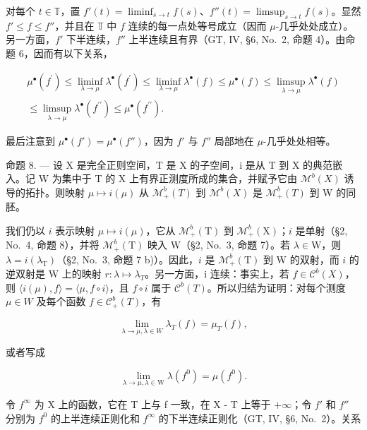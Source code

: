 对每个 \(t \in \mathbb{T}\)，置 \(f'(t) = \liminf_{s \to t} f(s)\)、\(f''(t) = \limsup_{s \to t} f(s)\)。显然 \(f' \leqslant f \leqslant f''\)，并且在 \(\mathbb{T}\) 中 \(f\) 连续的每一点处等号成立（因而 \(\mu\)-几乎处处成立）。另一方面，\(f'\) 下半连续，\(f''\) 上半连续且有界（GT, IV, §6, No.~2, 命题 4）。由命题 6，因而有以下关系，

\[
\begin{array}{c} \mu^ {\bullet} (f ^ {\prime}) \leqslant \liminf _ {\lambda \to \mu} \lambda^ {\bullet} (f ^ {\prime}) \leqslant \liminf _ {\lambda \to \mu} \lambda^ {\bullet} (f) \leqslant \mu^ {\bullet} (f) \leqslant \limsup _ {\lambda \to \mu} \lambda^ {\bullet} (f) \\ \leqslant \limsup _ {\lambda \to \mu} \lambda^ {\bullet} (f ^ {\prime \prime}) \leqslant \mu^ {\bullet} (f ^ {\prime \prime}). \end{array}
\]

最后注意到 \(\mu^{\bullet}(f') = \mu^{\bullet}(f'')\)，因为 \(f'\) 与 \(f''\) 局部地在 \(\mu\)-几乎处处相等。

命题 8. --- 设 X 是完全正则空间，T 是 X 的子空间，i 是从 T 到 X 的典范嵌入。记 W 为集中于 T 的 X 上有界正测度所成的集合，并赋予它由 \(\mathcal{M}^{b}(X)\) 诱导的拓扑。则映射 \(\mu \mapsto i(\mu)\) 从 \(\mathcal{M}_{+}^{b}(T)\) 到 \(\mathcal{M}^{b}(X)\) 是 \(\mathcal{M}_{+}^{b}(T)\) 到 W 的同胚。

我们仍以 \(i\) 表示映射 \(\mu \mapsto i(\mu)\)，它从 \(\mathcal{M}_{+}^{b}(\mathrm{T})\) 到 \(\mathcal{M}_{+}^{b}(\mathrm{X})\)；\(i\) 是单射（§2, No.~4, 命题 8），并将 \(\mathcal{M}_{+}^{b}(\mathrm{T})\) 映入 W（§2, No.~3, 命题 7）。若 \(\lambda \in \mathrm{W}\)，则 \(\lambda = i(\lambda_{\mathrm{T}})\)（§2, No.~3, 命题 7 b)）。因此，\(i\) 是 \(\mathcal{M}_{+}^{b}(\mathrm{T})\) 到 W 的双射，而 \(i\) 的逆双射是 W 上的映射 \(r : \lambda \mapsto \lambda_{T}\)。另一方面，i 连续：事实上，若 \(f \in \mathcal{C}^{b}(X)\)，则 \(\langle i(\mu), f \rangle = \langle \mu, f \circ i \rangle\)，且 \(f \circ i\) 属于 \(\mathcal{C}^{b}(T)\)。所以归结为证明：对每个测度 \(\mu \in W\) 及每个函数 \(f \in \mathcal{C}_{+}^{b}(T)\)，有

\[
\lim _ {\lambda \to \mu , \lambda \in W} \lambda_ {T} (f) = \mu_ {T} (f),
\]

或者写成

\[
\lim _ {\lambda \to \mu ,   \lambda \in \mathrm{W}} \lambda (f ^ {0}) = \mu (f ^ {0}).
\]

令 \(f^{\infty}\) 为 X 上的函数，它在 T 上与 f 一致，在 X - T 上等于 \(+\infty\)；令 \(f'\) 和 \(f''\) 分别为 \(f^{0}\) 的上半连续正则化和 \(f^{\infty}\) 的下半连续正则化（GT, IV, §6, No.~2）。关系

